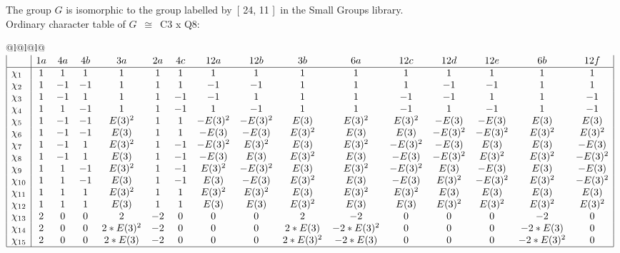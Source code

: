 \documentclass[varwidth=\maxdimen,border=10]{standalone}
\begin{document}
The group $G$ is isomorphic to the group labelled by\ [ 24, 11 ]\ in the Small Groups library.\\
Ordinary character table of $G$\ $\cong$\ C3 x Q8:\\
\begin{center}
\begin{tabular}{@{}l@{}l@{}l@{}}
\hline
\(\begin{array}{|l|ccccccccccccccc|}
  & 1a & 4a & 4b & 3a & 2a & 4c & 12a & 12b & 3b & 6a & 12c & 12d & 12e & 6b & 12f\\ \hline
\chi_{1} & 1 & 1 & 1 & 1 & 1 & 1 & 1 & 1 & 1 & 1 & 1 & 1 & 1 & 1 & 1\\
\chi_{2} & 1 & -1 & -1 & 1 & 1 & 1 & -1 & -1 & 1 & 1 & 1 & -1 & -1 & 1 & 1\\
\chi_{3} & 1 & -1 & 1 & 1 & 1 & -1 & -1 & 1 & 1 & 1 & -1 & -1 & 1 & 1 & -1\\
\chi_{4} & 1 & 1 & -1 & 1 & 1 & -1 & 1 & -1 & 1 & 1 & -1 & 1 & -1 & 1 & -1\\
\chi_{5} & 1 & -1 & -1 & E(3)^{2} & 1 & 1 & -E(3)^{2} & -E(3)^{2} & E(3) & E(3)^{2} & E(3)^{2} & -E(3) & -E(3) & E(3) & E(3)\\
\chi_{6} & 1 & -1 & -1 & E(3) & 1 & 1 & -E(3) & -E(3) & E(3)^{2} & E(3) & E(3) & -E(3)^{2} & -E(3)^{2} & E(3)^{2} & E(3)^{2}\\
\chi_{7} & 1 & -1 & 1 & E(3)^{2} & 1 & -1 & -E(3)^{2} & E(3)^{2} & E(3) & E(3)^{2} & -E(3)^{2} & -E(3) & E(3) & E(3) & -E(3)\\
\chi_{8} & 1 & -1 & 1 & E(3) & 1 & -1 & -E(3) & E(3) & E(3)^{2} & E(3) & -E(3) & -E(3)^{2} & E(3)^{2} & E(3)^{2} & -E(3)^{2}\\
\chi_{9} & 1 & 1 & -1 & E(3)^{2} & 1 & -1 & E(3)^{2} & -E(3)^{2} & E(3) & E(3)^{2} & -E(3)^{2} & E(3) & -E(3) & E(3) & -E(3)\\
\chi_{10} & 1 & 1 & -1 & E(3) & 1 & -1 & E(3) & -E(3) & E(3)^{2} & E(3) & -E(3) & E(3)^{2} & -E(3)^{2} & E(3)^{2} & -E(3)^{2}\\
\chi_{11} & 1 & 1 & 1 & E(3)^{2} & 1 & 1 & E(3)^{2} & E(3)^{2} & E(3) & E(3)^{2} & E(3)^{2} & E(3) & E(3) & E(3) & E(3)\\
\chi_{12} & 1 & 1 & 1 & E(3) & 1 & 1 & E(3) & E(3) & E(3)^{2} & E(3) & E(3) & E(3)^{2} & E(3)^{2} & E(3)^{2} & E(3)^{2}\\
\chi_{13} & 2 & 0 & 0 & 2 & -2 & 0 & 0 & 0 & 2 & -2 & 0 & 0 & 0 & -2 & 0\\
\chi_{14} & 2 & 0 & 0 & 2*E(3)^{2} & -2 & 0 & 0 & 0 & 2*E(3) & -2*E(3)^{2} & 0 & 0 & 0 & -2*E(3) & 0\\
\chi_{15} & 2 & 0 & 0 & 2*E(3) & -2 & 0 & 0 & 0 & 2*E(3)^{2} & -2*E(3) & 0 & 0 & 0 & -2*E(3)^{2} & 0\\
\hline
\end{array}\)\\
\end{tabular}
\end{center}
\end{document}
